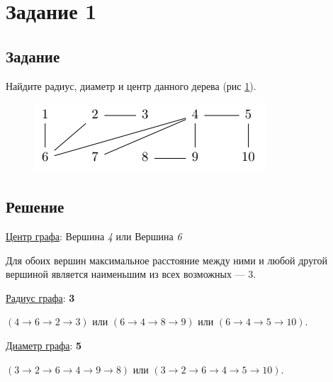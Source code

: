\section*{Задание 1}

\subsection*{Задание}

Найдите радиус, диаметр и центр данного дерева (рис \ref{fig:1t}).

\begin{figure}[H]
    \centering
    \includegraphics[width=0.7\linewidth]{photo/1t}
    \caption{}
    \label{fig:1t}
\end{figure}

\subsection*{Решение}

\underline{Центр графа}: Вершина \textit{4} или Вершина \textit{6}

Для обоих вершин максимальное расстояние между ними
и любой другой вершиной является 
наименьшим из всех возможных --- 3.

\underline{Радиус графа}: \textbf{3}

$(4 \rightarrow 6 \rightarrow 2 \rightarrow 3)$ 
или
$(6 \rightarrow 4 \rightarrow 8 \rightarrow 9)$ 
или
$(6 \rightarrow 4 \rightarrow 5 \rightarrow 10)$.

\underline{Диаметр графа}: \textbf{5}

$(3 \rightarrow 2 \rightarrow 6 \rightarrow 4 \rightarrow 9 \rightarrow 8)$ 
или
$(3 \rightarrow 2 \rightarrow 6 \rightarrow 4 \rightarrow 5 \rightarrow 10)$.

